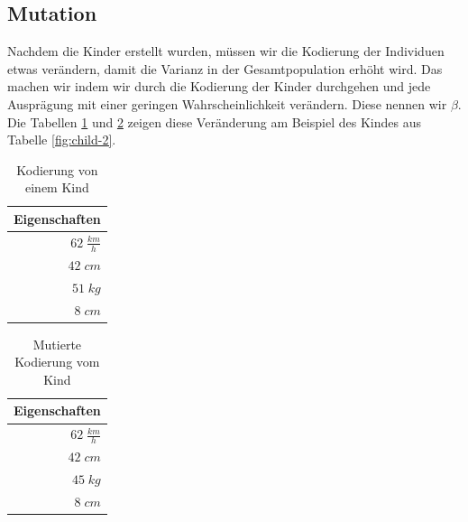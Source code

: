 \newpage
        \subsection{Mutation}
            Nachdem die Kinder erstellt wurden, müssen wir die Kodierung der Individuen etwas verändern, damit die Varianz in der Gesamtpopulation erhöht wird. Das machen wir indem wir durch die Kodierung der Kinder durchgehen und jede Ausprägung mit einer geringen Wahrscheinlichkeit verändern. Diese nennen wir $\beta$. Die Tabellen \ref{fig:child-enc} und \ref{fig:mut-child-enc} zeigen diese Veränderung am Beispiel des Kindes aus Tabelle \ref{fig:child-2}.

            \hspace*{-2cm}
            \begin{multicols}{2}
                \begin{table}[H]
                    \begin{center}
                    \begin{tabular}{ |r| } 
                        \hline
                        \hfill Eigenschaften  \\ \hline
                        \cellcolor{yellow!25} $ 62\; \frac{km}{h}$ \\ \hline
                        \cellcolor{blue!25}   $ 42\; cm          $ \\ \hline
                        \cellcolor{blue!25}   $ 51\; kg          $ \\ \hline
                        \cellcolor{yellow!25} $  8\; cm          $ \\ \hline
                    \end{tabular}
                    \end{center}
                    \caption{Kodierung von einem Kind \label{fig:child-enc}}
                \end{table}

                \begin{table}[H]
                    \begin{center}
                    \begin{tabular}{ |r| } 
                        \hline
                        \hfill Eigenschaften  \\ \hline
                        \cellcolor{yellow!25} $ 62\; \frac{km}{h}$ \\ \hline
                        \cellcolor{blue!25}   $ 42\; cm          $ \\ \hline
                        \cellcolor{red!25}    $ 45\; kg          $ \\ \hline
                        \cellcolor{yellow!25} $  8\; cm          $ \\ \hline
                    \end{tabular}
                    \end{center}
                    \caption{Mutierte Kodierung vom Kind\label{fig:mut-child-enc}}
                \end{table}
            \end{multicols}

